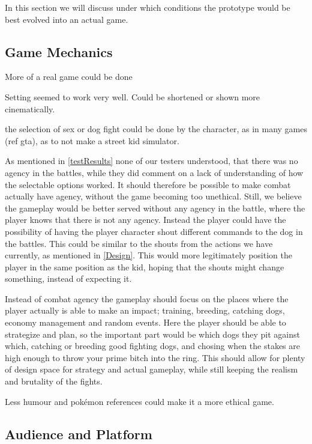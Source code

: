 In this section we will discuss under which conditions the prototype would be best evolved into an actual game.

\subsection{Game Mechanics}

More of a real game could be done\

Setting seemed to work very well.  Could be shortened or shown more cinematically.\

the selection of sex or dog fight could be done by the character, as in many games (ref gta), as to not make a street kid simulator.\

As mentioned in \ref{testResults} none of our testers understood, that there was no agency in the battles, while they did comment on a lack of understanding of how the selectable options worked. It should therefore be possible to make combat actually have agency, without the game becoming too unethical. Still, we believe the gameplay would be better served without any agency in the battle, where the player knows that there is not any agency. Instead the player could have the possibility of having the player character shout different commands to the dog in the battles. This could be similar to the shouts from the actions we have currently, as mentioned in \ref{Design}. This would more legitimately position the player in the same position as the kid, hoping that the shouts might change something, instead of expecting it.\

Instead of combat agency the gameplay should focus on the places where the player actually is able to make an impact; training, breeding, catching dogs, economy management and random events. Here the player should be able to strategize and plan, so the important part would be which dogs they pit against which, catching or breeding good fighting dogs, and chosing when the stakes are high enough to throw your prime bitch into the ring. This should allow for plenty of design space for strategy and actual gameplay, while still keeping the realism and brutality of the fights. \

Less humour and pokémon references could make it a more ethical game.

\subsection{Audience and Platform}

